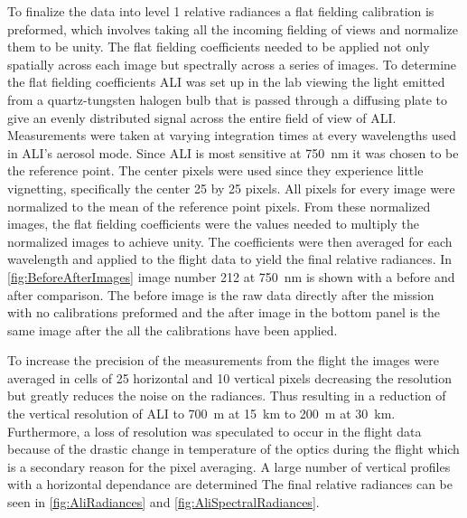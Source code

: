 To finalize the data into level 1 relative radiances a flat fielding calibration is preformed, which involves taking all the incoming fielding of views and normalize them to be unity. The flat fielding coefficients needed to be applied not only spatially across each image but spectrally across a series of images. To determine the flat fielding coefficients ALI was set up in the lab viewing the light emitted from a quartz-tungsten halogen bulb that is passed through a diffusing plate to give an evenly distributed signal across the entire field of view of ALI. Measurements were taken at varying integration times at every wavelengths used in ALI's aerosol mode. Since ALI is most sensitive at 750~nm it was chosen to be the reference point. The center pixels were used since they experience little vignetting, specifically the center 25 by 25 pixels. All pixels for every image were normalized to the mean of the reference point pixels. From these normalized images, the flat fielding coefficients were the values needed to multiply the normalized images to achieve unity. The coefficients were then averaged for each wavelength and applied to the flight data to yield the final relative radiances. In \autoref{fig:BeforeAfterImages} image number 212 at 750~nm is shown with a before and after comparison. The before image is the raw data directly after the mission with no calibrations preformed and the after image in the bottom panel is the same image after the all the calibrations have been applied.


To increase the precision of the measurements from the flight the images were averaged in cells of 25 horizontal and 10 vertical pixels decreasing the resolution but greatly reduces the noise on the radiances. Thus resulting in a reduction of the vertical resolution of ALI to 700~m at 15~km to 200~m at 30~km. Furthermore, a loss of resolution was speculated to occur in the flight data because of the drastic change in temperature of the optics during the flight which is a secondary reason for the pixel averaging. A large number of vertical profiles with a horizontal dependance are determined The final relative radiances can be seen in \autoref{fig:AliRadiances} and \autoref{fig:AliSpectralRadiances}.

